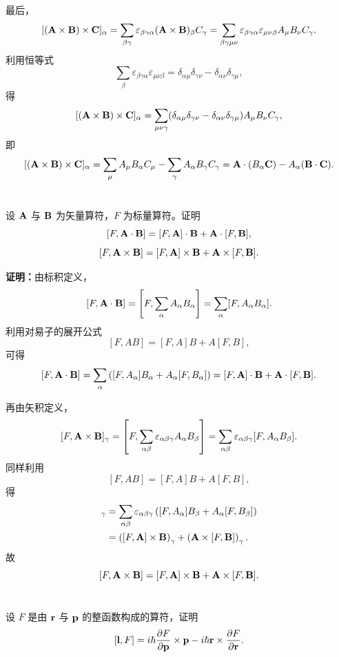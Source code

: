 \documentclass[12pt,a4paper]{article}
\begin{document}
最后，
\[
[(\vb{A}\times \vb{B})\times \vb{C}]_{\alpha}
=
\sum_{\beta\gamma}\varepsilon_{\beta\gamma\alpha}(\vb{A}\times \vb{B})_{\beta}C_{\gamma}
=
\sum_{\beta\gamma\mu\nu}\varepsilon_{\beta\gamma\alpha}\varepsilon_{\mu\nu\beta}A_{\mu}B_{\nu}C_{\gamma}.
\]
利用恒等式
\[
\sum_{\beta}\varepsilon_{\beta\gamma\alpha}\varepsilon_{\mu\nu\beta}
=
\delta_{\alpha\mu}\delta_{\gamma\nu}-\delta_{\alpha\nu}\delta_{\gamma\mu},
\]
得
\[
[(\vb{A}\times \vb{B})\times \vb{C}]_{\alpha}
=
\sum_{\mu\nu\gamma}
(\delta_{\alpha\mu}\delta_{\gamma\nu}-\delta_{\alpha\nu}\delta_{\gamma\mu})
A_{\mu}B_{\nu}C_{\gamma},
\]
即
\[
[(\vb{A}\times \vb{B})\times \vb{C}]_{\alpha}
=
\sum_{\mu}A_{\mu}B_{\alpha}C_{\mu}
-
\sum_{\gamma}A_{\alpha}B_{\gamma}C_{\gamma}
=
\vb{A}\cdot (B_{\alpha}\vb{C})-A_{\alpha}(\vb{B}\cdot \vb{C}).
\]

\section{}
设 \(\vb{A}\) 与 \(\vb{B}\) 为矢量算符，\(F\) 为标量算符。证明
\[
[F,\vb{A}\cdot \vb{B}]=[F,\vb{A}]\cdot \vb{B}+\vb{A}\cdot [F,\vb{B}],
\]
\[
[F,\vb{A}\times \vb{B}]=[F,\vb{A}]\times \vb{B}+\vb{A}\times [F,\vb{B}].
\]

\vspace{0.5cm}

\noindent\textbf{证明：}由标积定义，
\[
[F,\vb{A}\cdot \vb{B}]
=
\left[F,\sum_{\alpha}A_{\alpha}B_{\alpha}\right]
=
\sum_{\alpha}[F,A_{\alpha}B_{\alpha}].
\]
利用对易子的展开公式
\[
[F,AB]=[F,A]B+A[F,B],
\]
可得
\[
[F,\vb{A}\cdot \vb{B}]
=
\sum_{\alpha}\left([F,A_{\alpha}]B_{\alpha}+A_{\alpha}[F,B_{\alpha}]\right)
=
[F,\vb{A}]\cdot \vb{B}+\vb{A}\cdot [F,\vb{B}].
\]

再由矢积定义，
\[
[F,\vb{A}\times \vb{B}]_{\gamma}
=
\left[F,\sum_{\alpha\beta}\varepsilon_{\alpha\beta\gamma}A_{\alpha}B_{\beta}\right]
=
\sum_{\alpha\beta}\varepsilon_{\alpha\beta\gamma}[F,A_{\alpha}B_{\beta}].
\]
同样利用
\[
[F,AB]=[F,A]B+A[F,B],
\]
得
\begin{align*}
    [F,\vb{A}\times \vb{B}]_{\gamma}
    &=
    \sum_{\alpha\beta}\varepsilon_{\alpha\beta\gamma}
    \left([F,A_{\alpha}]B_{\beta}+A_{\alpha}[F,B_{\beta}]\right)\\
    &=
    \left([F,\vb{A}]\times \vb{B}\right)_{\gamma}
    +
    \left(\vb{A}\times [F,\vb{B}]\right)_{\gamma}.
\end{align*}
故
\[
[F,\vb{A}\times \vb{B}]
=
[F,\vb{A}]\times \vb{B}+\vb{A}\times [F,\vb{B}].
\]

\section{}
设 \(F\) 是由 \(\vb{r}\) 与 \(\vb{p}\) 的整函数构成的算符，证明
\[
[\vb{l},F]
=
i\hbar \pdv{F}{\vb{p}}\times \vb{p}
-
i\hbar \vb{r}\times \pdv{F}{\vb{r}}.
\]
\end{document}
